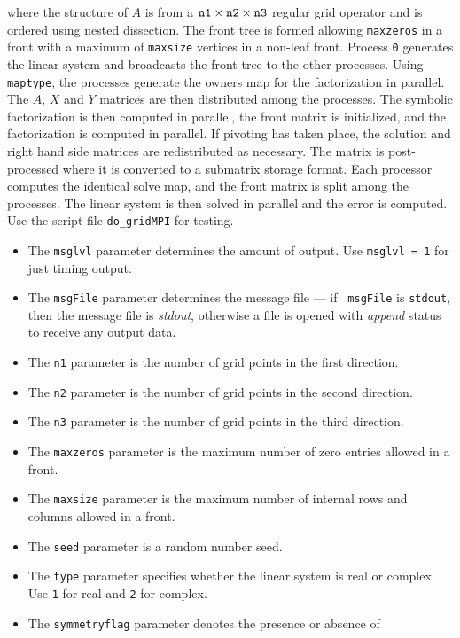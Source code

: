 \begin{enumerate}
where the structure of $A$ is from a 
${\tt n1} \times {\tt n2} \times {\tt n3}$ 
regular grid operator and is
ordered using nested dissection.
The front tree is formed allowing {\tt maxzeros} in a front with a
maximum of {\tt maxsize} vertices in a non-leaf front.
Process {\tt 0} generates the linear system and broadcasts the front
tree to the other processes.
Using {\tt maptype}, the processes generate the owners map 
for the factorization in parallel.
The $A$, $X$ and $Y$ matrices are then distributed among the
processes.
The symbolic factorization is then computed in parallel,
the front matrix is initialized, and the factorization is computed
in parallel.
If pivoting has taken place, the solution and right hand side
matrices are redistributed as necessary.
The matrix is post-processed where it is converted 
to a submatrix storage format.
Each processor computes the identical solve map, and the front
matrix is split among the processes.
The linear system is then solved in parallel and the error is
computed.
Use the script file {\tt do\_gridMPI} for testing.
\par
\begin{itemize}
\item
The {\tt msglvl} parameter determines the amount of output.
Use {\tt msglvl = 1} for just timing output.
\item
The {\tt msgFile} parameter determines the message file --- if {\tt
msgFile} is {\tt stdout}, then the message file is {\it stdout},
otherwise a file is opened with {\it append} status to receive any
output data.
\item
The {\tt n1} parameter is the number of grid points in the first
direction.
\item
The {\tt n2} parameter is the number of grid points in the second
direction.
\item
The {\tt n3} parameter is the number of grid points in the third
direction.
\item
The {\tt maxzeros} parameter is the maximum number of zero entries
allowed in a front.
\item
The {\tt maxsize} parameter is the maximum number of internal rows 
and columns allowed in a front.
\item
The {\tt seed} parameter is a random number seed.
\item
The {\tt type} parameter specifies whether the linear system is
real or complex.
Use {\tt 1} for real and {\tt 2} for complex.
\item
The {\tt symmetryflag} parameter denotes the presence or absence of

\end{itemize}
\end{enumerate}
